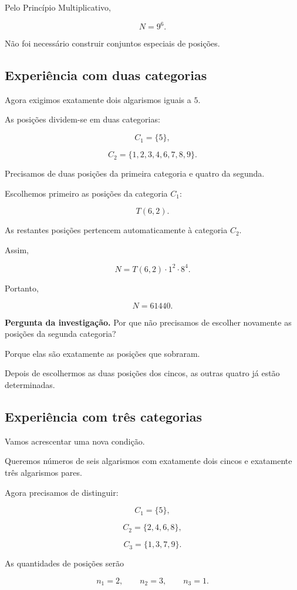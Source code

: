 \documentclass[11pt,a4paper,oneside]{book}
\newcommand{\Pergunta}[1]{\begin{perguntabox}\textbf{Pergunta da investigação.} #1\end{perguntabox}}
\begin{document}
Pelo Princípio Multiplicativo,

\[
\boxed{N=9^6}.
\]

Não foi necessário construir
conjuntos especiais de posições.

\subsection*{Experiência com duas categorias}

Agora exigimos exatamente
dois algarismos iguais a $5$.

As posições dividem-se em
duas categorias:

\[
C_1=\{5\},
\]

\[
C_2=\{1,2,3,4,6,7,8,9\}.
\]

Precisamos de duas posições
da primeira categoria
e quatro da segunda.

Escolhemos primeiro as posições
da categoria $C_1$:

\[
T(6,2).
\]

As restantes posições pertencem
automaticamente à categoria $C_2$.

Assim,

\[
N=T(6,2)\cdot1^2\cdot8^4.
\]

Portanto,

\[
\boxed{N=61440}.
\]

\Pergunta{Por que não precisamos
de escolher novamente as posições
da segunda categoria?}

Porque elas são exatamente
as posições que sobraram.

Depois de escolhermos as duas
posições dos cincos,
as outras quatro já estão determinadas.

\subsection*{Experiência com três categorias}

Vamos acrescentar uma nova condição.

Queremos números de seis algarismos
com exatamente dois cincos
e exatamente três algarismos pares.

Agora precisamos de distinguir:

\[
C_1=\{5\},
\]

\[
C_2=\{2,4,6,8\},
\]

\[
C_3=\{1,3,7,9\}.
\]

As quantidades de posições serão

\[
n_1=2,\qquad n_2=3,\qquad n_3=1.
\]
\end{document}
